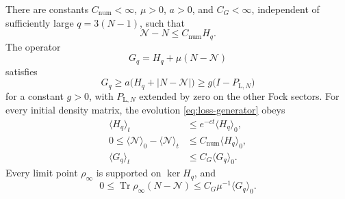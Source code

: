\begin{proposition}\label{prop:grand-canonical-coercivity}
There are constants $C_{\mathrm{num}}<\infty$, $\mu>0$, $a>0$, and
$C_G<\infty$, independent of sufficiently large $q=3(N-1)$, such that
\begin{equation}\label{eq:excess-number-bound}
 \mathcal N-N\le C_{\mathrm{num}}H_q.
\end{equation}
The operator
\begin{equation}\label{eq:coercive-G}
 G_q=H_q+\mu(N-\mathcal N)
\end{equation}
satisfies
\begin{equation}\label{eq:G-coercivity}
 G_q\ge a\bigl(H_q+|N-\mathcal N|\bigr)
 \ge g\bigl(I-P_{\mathrm L,N}\bigr)
\end{equation}
for a constant $g>0$, with $P_{\mathrm L,N}$ extended by zero on the
other Fock sectors.  For every initial density matrix, the evolution
\eqref{eq:loss-generator} obeys
\begin{align}
 \langle H_q\rangle_t&\le e^{-ct}\langle H_q\rangle_0,
       \label{eq:loss-energy-decay}\\
 0\le\langle\mathcal N\rangle_0-\langle\mathcal N\rangle_t
    &\le C_{\mathrm{num}}\langle H_q\rangle_0,
       \label{eq:loss-number-control}\\
 \langle G_q\rangle_t&\le C_G\langle G_q\rangle_0.
       \label{eq:loss-G-control}
\end{align}
Every limit point $\rho_\infty$ is supported on $\ker H_q$, and
\begin{equation}\label{eq:loss-hole-control}
 0\le\operatorname{Tr}\rho_\infty(N-\mathcal N)
       \le C_G\mu^{-1}\langle G_q\rangle_0.
\end{equation}
\end{proposition}
